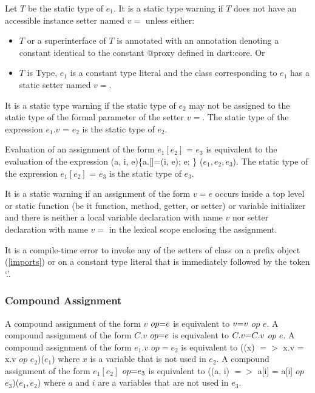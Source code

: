 \documentclass{article}
\newcommand{\code}[1]{{\sf #1}}
\begin{document}
\LMHash{}
Let $T$ be the static type of $e_1$. It is a static type warning if $T$ does not have an accessible instance setter named $v=$ unless either:
\begin{itemize}
\item $T$ or a superinterface of $T$ is annotated with an annotation denoting a constant identical to the constant \code{@proxy} defined in \code{dart:core}. Or
\item $T$ is \code{Type}, $e_1$ is a constant type literal and the class corresponding to $e_1$ has a static setter named $v=$. 
\end{itemize}



\LMHash{}
It is a static type warning if the static type of $e_2$ may not be assigned to the static type of the formal parameter of the setter $v=$.   The static type of the expression $e_1.v$ \code{=} $e_2$ is the static type of $e_2$.

\LMHash{}
Evaluation of an assignment of the form $e_1[e_2]$ \code{=} $e_3$ is equivalent to the evaluation of the expression \code{(a, i, e)\{a.[]=(i, e); \RETURN{} e; \} ($e_1, e_2, e_3$)}.  The static type of the expression $e_1[e_2]$ \code{=} $e_3$ is the static type of $e_3$.


\LMHash{}
It is a static warning if an assignment of the form $v = e$ occurs inside a top level or static function (be it function, method, getter, or setter) or variable initializer and there is neither a local variable declaration with name $v$  nor setter declaration with name $v=$ in the lexical scope enclosing the assignment.

\LMHash{}
It is a compile-time error to invoke any of the setters of class  on a prefix object (\ref{imports}) or on a constant type literal that is  immediately followed by the token `.'.



\subsubsection{Compound Assignment}

\LMHash{}
A compound assignment of the form $v$ $op\code{=} e$ is equivalent to $v \code{=} v$ $op$ $e$. A compound assignment of the form $C.v$ $op \code{=} e$ is equivalent to $C.v \code{=} C.v$ $op$ $e$. A compound assignment of the form $e_1.v$ $op = e_2$ is equivalent to \code{((x) $=>$ x.v = x.v $op$ $e_2$)($e_1$)} where $x$ is a variable that is not used in $e_2$. A compound assignment of the form  $e_1[e_2]$ $op\code{=} e_3$ is equivalent to 
\code{((a, i) $=>$ a[i] = a[i] $op$ $e_3$)($e_1, e_2$)} where $a$ and $i$ are a variables that are not used in $e_3$. 
\end{document}
